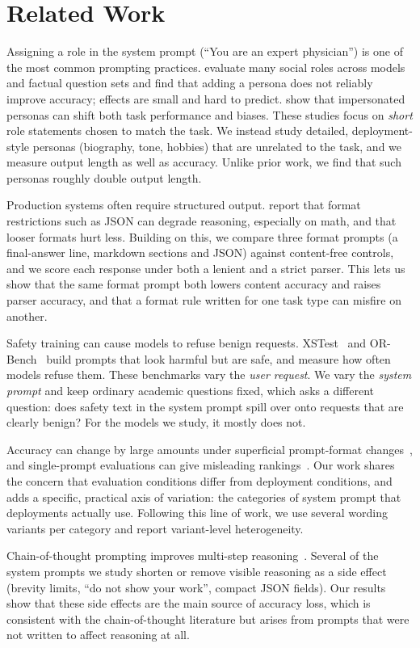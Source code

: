 \section{Related Work}
\label{sec:related}

 Assigning a role in the system prompt (``You are an expert physician'') is one of the most common prompting practices. \citet{zheng2023helpful} evaluate many social roles across models and factual question sets and find that adding a persona does not reliably improve accuracy; effects are small and hard to predict. \citet{salewski2023impersonation} show that impersonated personas can shift both task performance and biases. These studies focus on {\em short} role statements chosen to match the task. We instead study detailed, deployment-style personas (biography, tone, hobbies) that are unrelated to the task, and we measure output length as well as accuracy. Unlike prior work, we find that such personas roughly double output length.

 Production systems often require structured output. \citet{tam2024speak} report that format restrictions such as JSON can degrade reasoning, especially on math, and that looser formats hurt less. Building on this, we compare three format prompts (a final-answer line, markdown sections and JSON) against content-free controls, and we score each response under both a lenient and a strict parser. This lets us show that the same format prompt both lowers content accuracy and raises parser accuracy, and that a format rule written for one task type can misfire on another.

 Safety training can cause models to refuse benign requests. XSTest~\cite{rottger2023xstest} and OR-Bench~\cite{cui2024orbench} build prompts that look harmful but are safe, and measure how often models refuse them. These benchmarks vary the {\em user request}. We vary the {\em system prompt} and keep ordinary academic questions fixed, which asks a different question: does safety text in the system prompt spill over onto requests that are clearly benign? For the models we study, it mostly does not.

 Accuracy can change by large amounts under superficial prompt-format changes~\cite{sclar2023quantifying}, and single-prompt evaluations can give misleading rankings~\cite{mizrahi2024state}. Our work shares the concern that evaluation conditions differ from deployment conditions, and adds a specific, practical axis of variation: the categories of system prompt that deployments actually use. Following this line of work, we use several wording variants per category and report variant-level heterogeneity.

 Chain-of-thought prompting improves multi-step reasoning~\cite{wei2022chain,kojima2022large}. Several of the system prompts we study shorten or remove visible reasoning as a side effect (brevity limits, ``do not show your work'', compact JSON fields). Our results show that these side effects are the main source of accuracy loss, which is consistent with the chain-of-thought literature but arises from prompts that were not written to affect reasoning at all.
